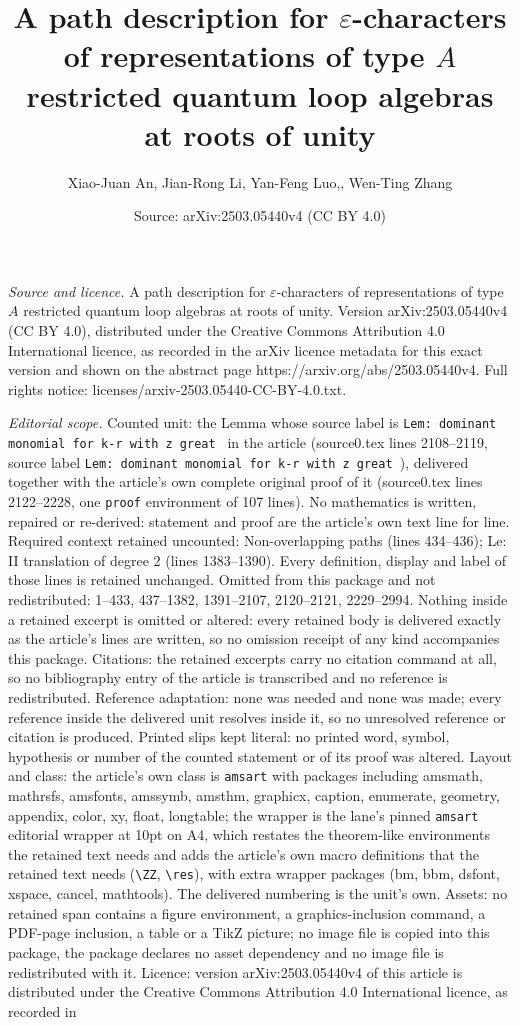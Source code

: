 \documentclass[10pt,a4paper]{amsart}
\title[A path description for $\varepsilon$-characters of represent]{A path description for $\varepsilon$-characters of representations of type $A$ restricted quantum loop algebras at roots of unity}
\author{Xiao-Juan An, Jian-Rong Li, Yan-Feng Luo,, Wen-Ting Zhang}
\date{Source: arXiv:2503.05440v4 (CC BY 4.0)}
\begin{document}
\maketitle

\noindent\emph{Source and licence.} A path description for $\varepsilon$-characters of representations of type $A$ restricted quantum loop algebras at roots of unity. Version arXiv:2503.05440v4 (CC BY 4.0), distributed under the Creative Commons Attribution 4.0 International licence, as recorded in the arXiv licence metadata for this exact version and shown on the abstract page https://arxiv.org/abs/2503.05440v4. Full rights notice: licenses/arxiv-2503.05440-CC-BY-4.0.txt.\par\smallskip

\noindent\textit{Editorial scope.} Counted unit: the Lemma whose source label is \texttt{Lem: dominant monomial for k-r with z great } in the article (source0.tex lines 2108--2119, source label \texttt{Lem: dominant monomial for k-r with z great }), delivered together with the article's own complete original proof of it (source0.tex lines 2122--2228, one \texttt{proof} environment of 107 lines). No mathematics is written, repaired or re-derived: statement and proof are the article's own text line for line. Required context retained uncounted: Non-overlapping paths (lines 434--436); Le: II translation of degree 2 (lines 1383--1390). Every definition, display and label of those lines is retained unchanged. Omitted from this package and not redistributed: 1--433, 437--1382, 1391--2107, 2120--2121, 2229--2994. Nothing inside a retained excerpt is omitted or altered: every retained body is delivered exactly as the article's lines are written, so no omission receipt of any kind accompanies this package. Citations: the retained excerpts carry no citation command at all, so no bibliography entry of the article is transcribed and no reference is redistributed. Reference adaptation: none was needed and none was made; every reference inside the delivered unit resolves inside it, so no unresolved reference or citation is produced. Printed slips kept literal: no printed word, symbol, hypothesis or number of the counted statement or of its proof was altered. Layout and class: the article's own class is \texttt{amsart} with packages including amsmath, mathrsfs, amsfonts, amssymb, amsthm, graphicx, caption, enumerate, geometry, appendix, color, xy, float, longtable; the wrapper is the lane's pinned \texttt{amsart} editorial wrapper at 10pt on A4, which restates the theorem-like environments the retained text needs and adds the article's own macro definitions that the retained text needs (\texttt{\textbackslash ZZ}, \texttt{\textbackslash res}), with extra wrapper packages (bm, bbm, dsfont, xspace, cancel, mathtools). The delivered numbering is the unit's own. Assets: no retained span contains a figure environment, a graphics-inclusion command, a PDF-page inclusion, a table or a TikZ picture; no image file is copied into this package, the package declares no asset dependency and no image file is redistributed with it. Licence: version arXiv:2503.05440v4 of this article is distributed under the Creative Commons Attribution 4.0 International licence, as recorded in 
\end{document}
